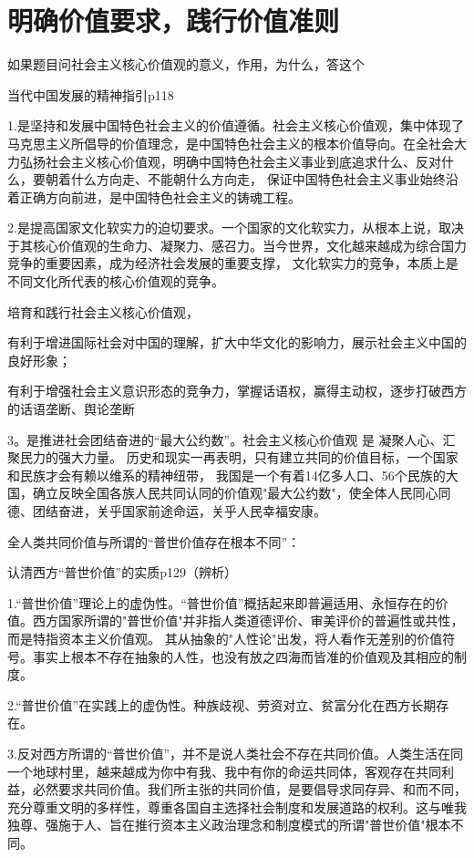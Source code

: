 \documentclass[lang=cn,10pt]{elegantbook}
\begin{document}
	\chapter{明确价值要求，践行价值准则}
	\begin{example}
		如果题目问社会主义核心价值观的意义，作用，为什么，答这个
		
		当代中国发展的精神指引p118
	\end{example}
	\begin{solution}
		1.是坚持和发展中国特色社会主义的价值遵循。社会主义核心价值观，集中体现了马克思主义所倡导的价值理念，是中国特色社会主义的根本价值导向。在全社会大力弘扬社会主义核心价值观，明确中国特色社会主义事业到底追求什么、反对什么，要朝着什么方向走、不能朝什么方向走， 保证中国特色社会主义事业始终沿着正确方向前进，是中国特色社会主义的铸魂工程。
		
		2.是提高国家文化软实力的迫切要求。一个国家的文化软实力，从根本上说，取决于其核心价值观的生命力、凝聚力、感召力。当今世界，文化越来越成为综合国力竞争的重要因素，成为经济社会发展的重要支撑， 文化软实力的竞争，本质上是不同文化所代表的核心价值观的竞争。 
		
		培育和践行社会主义核心价值观，
		
		有利于增进国际社会对中国的理解，扩大中华文化的影响力，展示社会主义中国的良好形象；
		
		有利于增强社会主义意识形态的竞争力，掌握话语权，赢得主动权，逐步打破西方的话语垄断、舆论垄断
		
		3。是推进社会团结奋进的“最大公约数”。社会主义核心价值观 是 凝聚人心、汇聚民力的强大力量。
		历史和现实一再表明，只有建立共同的价值目标，一个国家和民族才会有赖以维系的精神纽带， 我国是一个有着14亿多人口、56个民族的大国，确立反映全国各族人民共同认同的价值观"最大公约数"，使全体人民同心同德、团结奋进，关乎国家前途命运，关乎人民幸福安康。
	\end{solution}
	\begin{example}
		全人类共同价值与所谓的“普世价值存在根本不同”：
		
		认清西方“普世价值”的实质p129（辨析）
	\end{example}
	\begin{solution}
		
		1.“普世价值”理论上的虚伪性。“普世价值”概括起来即普遍适用、永恒存在的价值。西方国家所谓的"普世价值"并非指人类道德评价、审美评价的普遍性或共性，而是特指资本主义价值观。 其从抽象的"人性论"出发，将人看作无差别的价值符号。事实上根本不存在抽象的人性，也没有放之四海而皆准的价值观及其相应的制度。
		
		2.“普世价值”在实践上的虚伪性。种族歧视、劳资对立、贫富分化在西方长期存在。
		
		3.反对西方所谓的“普世价值”，并不是说人类社会不存在共同价值。人类生活在同一个地球村里，越来越成为你中有我、我中有你的命运共同体，客观存在共同利益，必然要求共同价值。我们所主张的共同价值，是要倡导求同存异、和而不同，充分尊重文明的多样性，尊重各国自主选择社会制度和发展道路的权利。这与唯我独尊、强施于人、旨在推行资本主义政治理念和制度模式的所谓"普世价值"根本不同。
		
	\end{solution}
\end{document}
